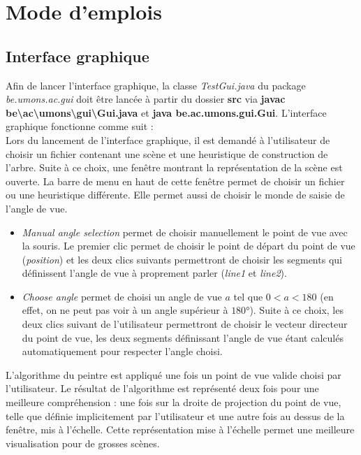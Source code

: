 \documentclass[11pt,a4paper]{article}
\theoremstyle{definition}
\theoremstyle{remark}
\begin{document}
\begin{table}
{\begin{tabular}{|c|c||c|c|c|c|c|}
\end{tabular}%
}
\end{table}
\section{Mode d'emplois}

\subsection{Interface graphique}

Afin de lancer l'interface graphique, la classe \textit{TestGui.java} du package \textit{be.umons.ac.gui} doit être lancée à partir du dossier \textbf{src} via \textbf{javac be\textbackslash ac\textbackslash umons\textbackslash gui\textbackslash Gui.java} et \textbf{java be.ac.umons.gui.Gui}. L'interface graphique fonctionne comme suit : \\

Lors du lancement de l'interface graphique, il est demandé à l'utilisateur de choisir un fichier contenant une scène et une heuristique de construction de l'arbre. Suite à ce choix, une fenêtre montrant la représentation de la scène est ouverte. La barre de menu en haut de cette fenêtre permet de choisir un fichier ou une heuristique différente. Elle permet aussi de choisir le monde de  saisie de l'angle de vue.\\

\begin{itemize}
	\item \emph{Manual angle selection} permet de choisir manuellement le point de vue avec la souris. Le premier clic permet de choisir le point de départ du point de vue (\emph{position}) et les deux clics suivants permettront de choisir les segments qui définissent l'angle de vue à proprement parler (\emph{line1} et \emph{line2}).
	\item \emph{Choose angle} permet de choisi un angle de vue $a$ tel que $0<a<180$ (en effet, on ne peut pas voir à un angle supérieur à $180°$). Suite à ce choix, les deux clics suivant de l'utilisateur permettront de choisir le vecteur directeur du point de vue, les deux segments définissant l'angle de vue étant calculés automatiquement pour respecter l'angle choisi.
\end{itemize}
\vspace{20}

L'algorithme du peintre est appliqué une fois un point de vue valide choisi par l'utilisateur. Le résultat de l'algorithme est représenté deux fois pour une meilleure compréhension : une fois sur la droite de projection du point de vue, telle que définie implicitement par l'utilisateur et une autre fois au dessus de la fenêtre, mis à l'échelle. Cette représentation mise à l'échelle permet une meilleure visualisation pour de grosses scènes.
\end{document}
